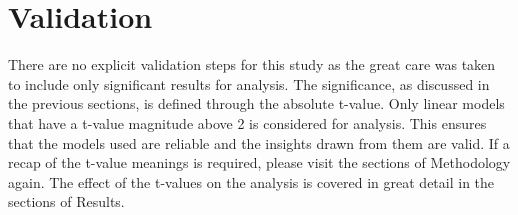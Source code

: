 \chapter{Validation}

There are no explicit validation steps for this study as the great care was taken to include only significant results for analysis. The significance, as discussed in the previous sections, is defined through the absolute t-value. Only linear models that have a t-value magnitude above 2 is considered for analysis. This ensures that the models used are reliable and the insights drawn from them are valid. If a recap of the t-value meanings is required, please visit the sections of Methodology again. The effect of the t-values on the analysis is covered in great detail in the sections of Results. 


